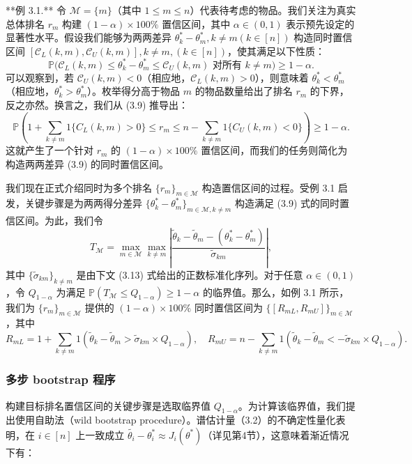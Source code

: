 **例 3.1.** 令 $\mathcal{M} = \{m\}$（其中 $1 \leq m \leq n$）代表待考虑的物品。我们关注为真实总体排名 $r_{m}$ 构建 $(1 - \alpha) \times 100\%$ 置信区间，其中 $\alpha \in (0,1)$ 表示预先设定的显著性水平。假设我们能够为两两差异 $\theta_{k}^{*} - \theta_{m}^{*}, k \neq m (k \in [n])$ 构造同时置信区间 $[\mathcal{C}_L(k,m), \mathcal{C}_U(k,m)], k \neq m, (k \in [n])$，使其满足以下性质：
\[
\mathbb{P}\Big(\mathcal{C}_L(k,m) \leq \theta_k^* - \theta_m^* \leq \mathcal{C}_U(k,m) \text{ 对所有 } k \neq m\Big) \geq 1 - \alpha . \tag{3.9}
\]
可以观察到，若 $\mathcal{C}_U(k,m) < 0$（相应地，$\mathcal{C}_L(k,m) > 0$），则意味着 $\theta_k^* < \theta_m^*$（相应地，$\theta_k^* > \theta_m^*$）。枚举得分高于物品 $m$ 的物品数量给出了排名 $r_{m}$ 的下界，反之亦然。换言之，我们从 (3.9) 推导出：
\[
\mathbb{P}\left(1 + \sum_{k \neq m} 1 \{C_L(k,m) > 0\} \leq r_m \leq n - \sum_{k \neq m} 1 \{C_U(k,m) < 0\}\right) \geq 1 - \alpha . \tag{3.10}
\]
这就产生了一个针对 $r_{m}$ 的 $(1 - \alpha) \times 100\%$ 置信区间，而我们的任务则简化为构造两两差异 (3.9) 的同时置信区间。

我们现在正式介绍同时为多个排名 $\{r_m\}_{m \in \mathcal{M}}$ 构造置信区间的过程。受例 3.1 启发，关键步骤是为两两得分差异 $\{\theta_k^* - \theta_m^*\}_{m \in \mathcal{M}, k \neq m}$ 构造满足 (3.9) 式的同时置信区间。为此，我们令
\[
T_{\mathcal{M}} = \max_{m \in \mathcal{M}} \max_{k \neq m} \left| \frac{\widetilde{\theta}_k - \widetilde{\theta}_m - (\theta_k^* - \theta_m^*)}{\widetilde{\sigma}_{km}} \right|, \tag{3.11}
\]
其中 $\{\widetilde{\sigma}_{km}\}_{k \neq m}$ 是由下文 (3.13) 式给出的正数标准化序列。对于任意 $\alpha \in (0,1)$，令 $Q_{1 - \alpha}$ 为满足 $\mathbb{P}(T_{\mathcal{M}} \leq Q_{1 - \alpha}) \geq 1 - \alpha$ 的临界值。那么，如例 3.1 所示，我们为 $\{r_m\}_{m \in \mathcal{M}}$ 提供的 $(1 - \alpha) \times 100\%$ 同时置信区间为 $\{[R_{mL}, R_{mU}] \}_{m \in \mathcal{M}}$，其中
$$
R_{mL} = 1 + \sum_{k \neq m} 1 \left(\widetilde{\theta}_k - \widetilde{\theta}_m > \widetilde{\sigma}_{km} \times Q_{1 - \alpha}\right), \quad R_{mU} = n - \sum_{k \neq m} 1 \left(\widetilde{\theta}_k - \widetilde{\theta}_m < -\widetilde{\sigma}_{km} \times Q_{1 - \alpha}\right).
$$

\subsubsection{多步 bootstrap 程序}

构建目标排名置信区间的关键步骤是选取临界值 $Q_{1 - \alpha}$。为计算该临界值，我们提出使用自助法（wild bootstrap procedure）。谱估计量（3.2）的不确定性量化表明，在 $i\in [n]$ 上一致成立 $\widetilde{\theta_{i}} - \theta_{i}^{*}\approx J_{i}(\theta^{*})$（详见第4节），这意味着渐近情况下有：

